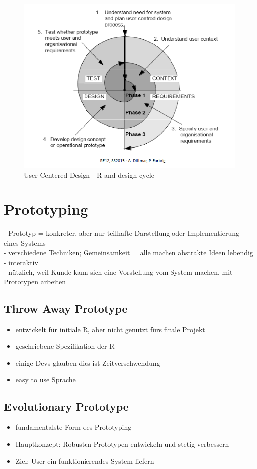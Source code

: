 \begin{figure}[!h]
	\centering
	\includegraphics[scale=0.7]{img/user_centered_activities_app2.png}
	\caption{User-Centered Design - R and design cycle}
\end{figure}


\newpage
\section{Prototyping}
- Prototyp = konkreter, aber nur teilhafte Darstellung oder Implementierung eines Systems\\
- verschiedene Techniken; Gemeinsamkeit = alle machen abstrakte Ideen lebendig\\
- interaktiv\\
- nützlich, weil Kunde kann sich eine Vorstellung vom System machen, mit Prototypen arbeiten

\subsection{Throw Away Prototype}
\begin{itemize}
	\item entwickelt für initiale R, aber nicht genutzt fürs finale Projekt
	\item geschriebene Spezifikation der R
	\item einige Devs glauben dies ist Zeitverschwendung
	\item easy to use Sprache
\end{itemize}

\subsection{Evolutionary Prototype}
\begin{itemize}
	\item fundamentalste Form des Prototyping
	\item Hauptkonzept: Robusten Prototypen entwickeln und stetig verbessern
	\item Ziel: User ein funktionierendes System liefern
\end{itemize}

